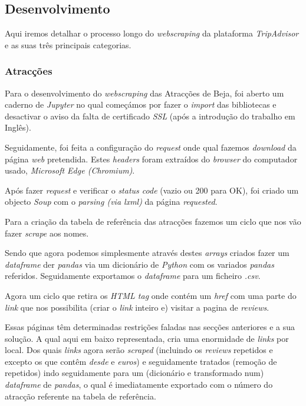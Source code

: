 \subsection{Desenvolvimento}

Aqui iremos detalhar o processo longo do \textit{webscraping} da plataforma \textit{TripAdvisor} e as suas três principais categorias.

\subsubsection{Atracções}
Para o desenvolvimento do \textit{webscraping} das Atracções de Beja, foi aberto um caderno de \textit{Jupyter} no qual começámos por fazer o \textit{import} das bibliotecas e desactivar o aviso da falta de certificado \textit{SSL} (após a introdução do trabalho em Inglês).

Seguidamente, foi feita a configuração do \textit{request} onde qual fazemos \textit{download} da página \textit{web} pretendida. Estes \textit{headers} foram extraídos do \textit{browser} do computador usado, \textit{Microsoft Edge (Chromium)}.

Após fazer \textit{request} e verificar o \textit{status code} (vazio ou 200 para OK), foi criado um objecto \textit{Soup} com o \textit{parsing (via lxml)} da página \textit{requested}.

Para a criação da tabela de referência das atracções fazemos um ciclo que nos vão fazer \textit{scrape} aos nomes.

Sendo que agora podemos simplesmente através destes \textit{arrays} criados fazer um \textit{dataframe} der \textit{pandas} via um dicionário de \textit{Python} com os variados \textit{pandas} referidos. Seguidamente exportamos o \textit{dataframe} para um ficheiro \textit{.csv}.

Agora um ciclo que retira os \textit{HTML tag} onde  contém um \textit{href} com uma parte do \textit{link} que nos possibilita (criar o \textit{link} inteiro e) visitar a pagina de \textit{reviews}.

Essas páginas têm determinadas restrições faladas nas secções anteriores e a sua solução. A qual aqui em baixo representada, cria uma enormidade de \textit{links} por local.
Dos quais \textit{links} agora serão \textit{scraped} (incluindo os \textit{reviews} repetidos e excepto os que contêm \textit{desde} e \textit{euros}) e seguidamente tratados (remoção de repetidos) indo seguidamente para um (dicionário e transformado num) \textit{dataframe} de \textit{pandas}, o qual é imediatamente exportado com o número do atracção referente na tabela de referência.
